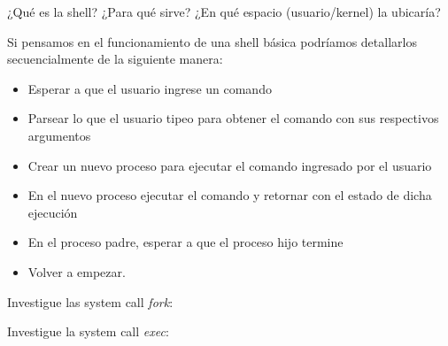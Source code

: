 \begin{questions}
\question ¿Qué es la shell? ¿Para qué sirve?
\question ¿En qué espacio (usuario/kernel) la ubicaría?

\question Si pensamos en el funcionamiento de una shell básica podríamos
detallarlos secuencialmente de la siguiente manera:
\begin{itemize}
  \item Esperar a que el usuario ingrese un comando
  \item Parsear lo que el usuario tipeo para obtener el comando con sus respectivos argumentos
  \item Crear un nuevo proceso para ejecutar el comando ingresado por el usuario
  \item En el nuevo proceso ejecutar el comando y retornar con el estado de dicha ejecución
  \item En el proceso padre, esperar a que el proceso hijo termine
  \item Volver a empezar.
\end{itemize}

\question Investigue las system call \textit{fork}:

\question Investigue la system call \textit{exec}:
\end{questions}
